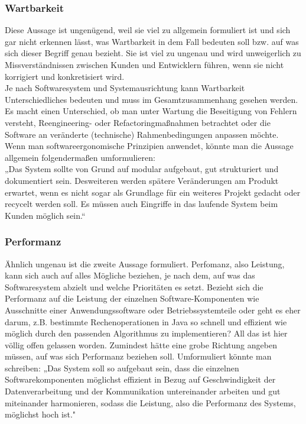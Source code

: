 \documentclass{swp1}
\begin{document}
\subsubsection*{Wartbarkeit}
Diese Aussage ist ungenügend, weil sie viel zu allgemein formuliert ist und sich gar nicht erkennen lässt, was Wartbarkeit in dem Fall bedeuten soll bzw. auf was sich dieser Begriff genau bezieht. Sie ist viel zu ungenau und wird unweigerlich zu Missverständnissen zwischen Kunden und Entwicklern führen, wenn sie nicht korrigiert und konkretisiert wird. \\
Je nach Softwaresystem und Systemausrichtung kann Wartbarkeit Unterschiedliches bedeuten und muss im Gesamtzusammenhang gesehen werden. Es macht einen Unterschied, ob man unter Wartung die Beseitigung von Fehlern versteht, Reengineering- oder Refactoringmaßnahmen betrachtet oder die Software an veränderte (technische) Rahmenbedingungen anpassen möchte. \\
Wenn man softwareergonomische Prinzipien anwendet, könnte man die Aussage allgemein folgendermaßen umformulieren:\\
„Das System sollte von Grund auf modular aufgebaut, gut strukturiert und dokumentiert sein.
Desweiteren werden spätere Veränderungen am Produkt erwartet, wenn es nicht sogar als
Grundlage für ein weiteres Projekt gedacht oder recycelt werden soll. Es müssen auch Eingriffe in
das laufende System beim Kunden möglich sein.“

\subsubsection*{Performanz}
Ähnlich ungenau ist die zweite Aussage formuliert. Perfomanz, also Leistung, kann sich auch auf alles Mögliche beziehen, je nach dem, auf was das Softwaresystem abzielt und welche Prioritäten es setzt. Bezieht sich die Performanz auf die Leistung der einzelnen Software-Komponenten wie Ausschnitte einer Anwendungssoftware oder Betriebssystemteile oder geht es eher darum, z.B. bestimmte Rechenoperationen in Java so schnell und effizient wie möglich durch den passenden Algorithmus zu implementieren? All das ist hier völlig offen gelassen worden. Zumindest hätte eine grobe Richtung angeben müssen, auf was sich Performanz beziehen soll.
Umformuliert könnte man schreiben: „Das System soll so aufgebaut sein, dass die einzelnen Softwarekomponenten möglichst effizient in Bezug auf Geschwindigkeit der Datenverarbeitung und der Kommunikation untereinander arbeiten und gut miteinander harmonieren, sodass die Leistung, also die Performanz des Systems, möglichst hoch ist."
\end{document}
